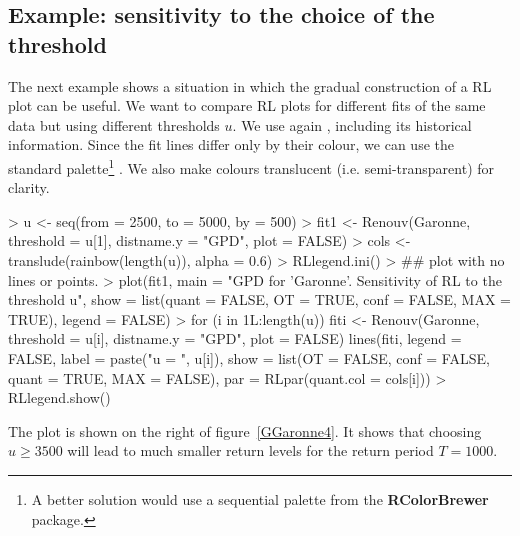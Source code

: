 \documentclass[a4paper]{report}
\newcommand{\pkg}[1]{\textbf{#1}}
\begin{document}
\subsection{Example: sensitivity to the choice of the threshold}
\label{SensThreshold}
The next example shows a situation in which the gradual construction of a
RL plot can be useful. We want to compare RL plots for different fits of the
same data but using different thresholds $u$. We use again \verb@Garonne@,
including its historical information. Since the fit lines differ only by their
colour, we can use the standard palette\footnote{A better solution would use a
  sequential palette from the \pkg{RColorBrewer} package.} \verb@rainbow@. We
also make colours translucent (i.e. semi-transparent) for clarity.

\begin{Schunk}
\begin{Sinput}
> u <- seq(from = 2500, to = 5000, by = 500)
> fit1 <- Renouv(Garonne, threshold = u[1], distname.y = "GPD", plot = FALSE)
> cols <- translude(rainbow(length(u)), alpha = 0.6)
> RLlegend.ini()
> ## plot with no lines or points.
> plot(fit1,
       main = "GPD for 'Garonne'. Sensitivity of RL to the threshold u",
       show = list(quant = FALSE, OT = TRUE, conf = FALSE, MAX = TRUE),
       legend = FALSE)               
> for (i in 1L:length(u)) {
      fiti <- Renouv(Garonne, threshold = u[i], distname.y = "GPD", plot = FALSE)
      lines(fiti, legend = FALSE,
            label = paste("u = ", u[i]),
            show = list(OT = FALSE, conf = FALSE, quant = TRUE, MAX = FALSE),
            par = RLpar(quant.col = cols[i]))
  }
> RLlegend.show()
\end{Sinput}
\end{Schunk}
\noindent
The plot is shown on the right of figure~\ref{GGaronne4}. It shows
that choosing $u \geqslant 3500$ will lead to much smaller
return levels for the return period $T=1000$.


\end{document}
